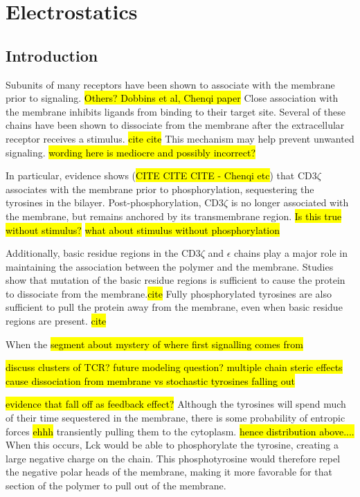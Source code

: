 \documentclass[../../AdvancementSummary.tex]{subfiles}
\begin{document}
\section{Electrostatics}

\subsection{Introduction}

Subunits of many receptors have been shown to associate with the membrane prior to signaling. \hl{Others?  Dobbins et al, Chenqi paper} Close association with the membrane inhibits ligands from binding to their target site. Several of these chains have been shown to dissociate from the membrane after the extracellular receptor receives a stimulus. \hl{cite cite} This mechanism may help prevent unwanted signaling. \hl{wording here is mediocre and possibly incorrect?}

In particular, evidence shows (\hl{CITE CITE CITE - Chenqi etc}) that CD3$\zeta$ associates with the membrane prior to phosphorylation, sequestering the tyrosines in the bilayer. Post-phosphorylation, CD3$\zeta$ is no longer associated with the membrane, but remains anchored by its transmembrane region. \hl{Is this true without stimulus?} \hl{what about stimulus without phosphorylation}

Additionally, basic residue regions in the CD3$\zeta$ and $\epsilon$ chains play a major role in maintaining the association between the polymer and the membrane. Studies show that mutation of the basic residue regions is sufficient to cause the protein to dissociate from the membrane.\hl{cite} Fully phosphorylated tyrosines are also sufficient to pull the protein away from the membrane, even when basic residue regions are present. \hl{cite} 

When the \hl{segment about mystery of where first signalling comes from}

\hl{discuss clusters of TCR? future modeling question? multiple chain steric effects cause dissociation from membrane vs stochastic tyrosines falling out}

\hl{evidence that fall off as feedback effect?} Although the tyrosines will spend much of their time sequestered in the membrane, there is some probability of entropic forces \hl{ehhh} transiently pulling them to the cytoplasm. \hl{hence distribution above....} When this occurs, Lck would be able to phosphorylate the tyrosine, creating a large negative charge on the chain. This phosphotyrosine would therefore repel the negative polar heads of the membrane, making it more favorable for that section of the polymer to pull out of the membrane.  
\end{document}
